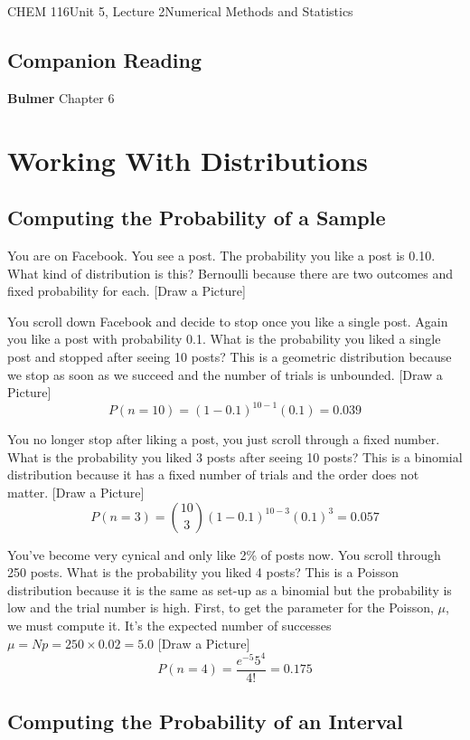 \documentclass{article}
\begin{document}
\begin{tdoc}{CHEM 116}{Unit 5, Lecture 2}{Numerical Methods and Statistics}

  \subsection*{Companion Reading}
  \textbf{Bulmer} Chapter 6

\section{Working With Distributions}

\subsection{Computing the Probability of a Sample}

You are on Facebook. You see a post. The probability you like a post
is 0.10. What kind of distribution is this? Bernoulli because there
are two outcomes and fixed probability for each. [Draw a Picture]

You scroll down Facebook and decide to stop once you like a single
post. Again you like a post with probability 0.1. What is the
probability you liked a single post and stopped after seeing 10
posts? This is a geometric distribution because we stop as soon as we
succeed and the number of trials is unbounded. [Draw a Picture]
\[
P(n=10) = (1 - 0.1)^{10 - 1}(0.1) = 0.039
\]

You no longer stop after liking a post, you just scroll through a
fixed number. What is the probability you liked 3 posts after seeing
10 posts? This is a binomial distribution because it has a fixed
number of trials and the order does not matter. [Draw a Picture]
\[
P(n=3) = {10 \choose 3} (1 - 0.1)^{10 -3 }(0.1)^{3} = 0.057
\]

You've become very cynical and only like 2\% of posts now. You scroll
through 250 posts. What is the probability you liked 4 posts? This is
a Poisson distribution because it is the same as set-up as a binomial
but the probability is low and the trial number is high. First, to
get the parameter for the Poisson, $\mu$, we must compute it. It's
the expected number of successes $\mu = Np = 250 \times 0.02 = 5.0$
[Draw a Picture]
\[
P(n=4) = \frac{e^{-5}5^4}{4!} = 0.175
\]

 \subsection{Computing the Probability of an Interval}


\end{tdoc}
\end{document}
